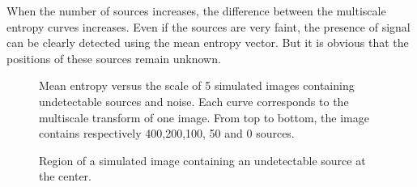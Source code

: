 When the number of sources increases, the difference between the multiscale
entropy curves increases. Even if the sources are very faint, the presence
of signal can be clearly detected using the mean entropy vector. But it is 
obvious that the positions of these sources remain unknown.
 
\begin{figure}[htb]
\centerline{
\vbox{
}}
\caption{Mean entropy versus the scale of 5 simulated images containing undetectable
sources and noise. Each curve corresponds to the multiscale transform
of one image. From
top to bottom, the image contains respectively 400,200,100, 50 and 0 sources.}
\label{fig_source1}
\end{figure}

\begin{figure}[htb]
\centerline{
\vbox{
}}
\caption{Region of a simulated image containing an undetectable source at the
center.}
\label{fig_source2}
\end{figure}

